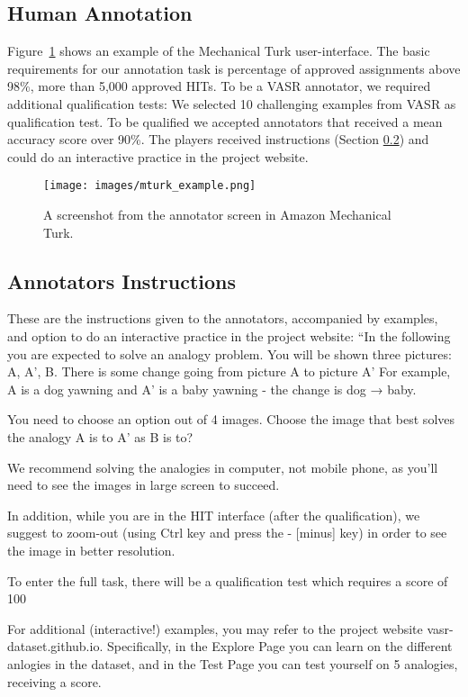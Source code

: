 \documentclass[letterpaper]{article} \usepackage{aaai23}  \usepackage{times}  \usepackage{helvet}  \usepackage{courier}  \usepackage[hyphens]{url}  \usepackage{graphicx} \urlstyle{rm} \def\UrlFont{\rm}  \usepackage{natbib}  \usepackage{caption} \frenchspacing  \setlength{\pdfpagewidth}{8.5in}  \setlength{\pdfpageheight}{11in}  \usepackage{algorithm}
\begin{document}
\subsection{Human Annotation}
\label{sec:human_annotation_appendix}
Figure~\ref{fig:mturk_example} shows an example of the Mechanical Turk user-interface. The basic requirements for our annotation task is percentage of approved assignments above 98\%, more than 5,000 approved HITs. To be a VASR annotator, we required additional qualification tests: We selected 10 challenging examples from VASR as qualification test. To be qualified we accepted annotators that received a mean accuracy score over 90\%. The players received instructions (Section \ref{sec:instructions}) and could do an interactive practice in the project website.
\begin{figure}[!tb]
\centering
\newcommand{\figlen}[0]{\columnwidth}
    \texttt{[image: images/mturk\_example.png]}\\
    \caption{A screenshot from the annotator screen in Amazon Mechanical Turk.}
    \label{fig:mturk_example}
\end{figure}

\subsection{Annotators Instructions} 
\label{sec:instructions}
These are the instructions given to the annotators, accompanied by examples, and option to do an interactive practice in the project website:
``In the following you are expected to solve an analogy problem.
You will be shown three pictures: A, A', B.
There is some change going from picture A to picture A'
For example, A is a dog yawning and A' is a baby yawning - the change is dog → baby.


You need to choose an option out of 4 images.
Choose the image that best solves the analogy
A is to A' as B is to?


We recommend solving the analogies in computer, not mobile phone, as you'll need to see the images in large screen to succeed.

In addition, while you are in the HIT interface (after the qualification), we suggest to zoom-out (using Ctrl key and press the - [minus] key) in order to see the image in better resolution.


To enter the full task, there will be a qualification test which requires a score of 100

For additional (interactive!) examples, you may refer to the project website vasr-dataset.github.io.
Specifically, in the Explore Page you can learn on the different anlogies in the dataset, and in the Test Page you can test yourself on 5 analogies, receiving a score.
\end{document}
